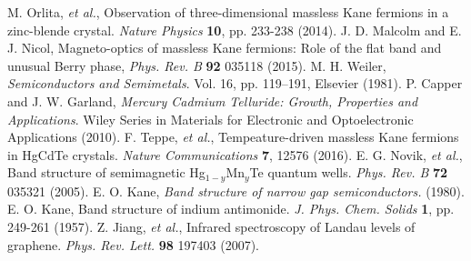 \documentclass[titlepage,a4paper]{book}
\begin{document}
\begin{thebibliography}{99}
M. Orlita, \textit{et al.}, Observation of three-dimensional massless Kane fermions in a zinc-blende crystal. \textit{Nature Physics} \textbf{10}, pp. 233-238 (2014).
J. D. Malcolm and E. J. Nicol, Magneto-optics of massless Kane fermions: Role of the flat band and unusual Berry phase, \textit{Phys. Rev. B} \textbf{92} 035118 (2015).
M. H. Weiler, \textit{Semiconductors and Semimetals}. Vol. 16, pp. 119–191, Elsevier (1981).
P. Capper and J. W. Garland, \textit{Mercury Cadmium Telluride: Growth, Properties and Applications}. Wiley Series in Materials for Electronic and Optoelectronic Applications (2010).
F. Teppe, \textit{et al.}, Tempeature-driven massless Kane fermions in HgCdTe crystals. \textit{Nature Communications} \textbf{7}, 12576 (2016).
E. G. Novik, \textit{et al.}, Band structure of semimagnetic Hg$_{1-y}$Mn$_y$Te quantum wells. \textit{Phys. Rev. B} \textbf{72} 035321 (2005).
E. O. Kane, \textit{Band structure of narrow gap semiconductors.} (1980).
E. O. Kane, Band structure of indium antimonide. \textit{J. Phys. Chem. Solids} \textbf{1}, pp. 249-261 (1957).
Z. Jiang, \textit{et al.}, Infrared spectroscopy of Landau levels of graphene. \textit{Phys. Rev. Lett.} \textbf{98} 197403 (2007).



\end{thebibliography}
\end{document}
